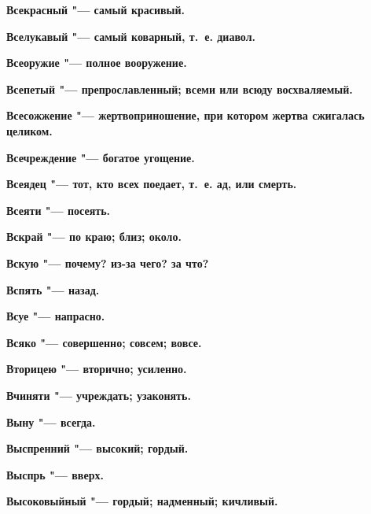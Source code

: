 \begin{multicols}{2}
\bfseries Всекрасный\normalfont{} "--- самый красивый. 




\bfseries Вселукавый\normalfont{} "--- самый коварный, т.~е. диавол. 




\bfseries Всеоружие\normalfont{} "--- полное вооружение. 




\bfseries Всепетый\normalfont{} "--- препрославленный; всеми или всюду восхваляемый. 




\bfseries Всесожжение\normalfont{} "--- жертвоприношение, при котором жертва сжигалась целиком. 




\bfseries Всечреждение\normalfont{} "--- богатое угощение. 




\bfseries Всеядец\normalfont{} "--- тот, кто всех поедает, т.~е. ад, или смерть. 




\bfseries Всеяти\normalfont{} "--- посеять. 




\bfseries Вскрай\normalfont{} "--- по краю; близ; около. 




\bfseries Вскую\normalfont{} "--- почему? из-за чего? за что? 




\bfseries Вспять\normalfont{} "--- назад. 




\bfseries Всуе\normalfont{} "--- напрасно. 




\bfseries Всяко\normalfont{} "--- совершенно; совсем; вовсе. 




\bfseries Вторицею\normalfont{} "--- вторично; усиленно. 




\bfseries Вчиняти\normalfont{} "--- учреждать; узаконять. 




\bfseries Выну\normalfont{} "--- всегда. 




\bfseries Выспренний\normalfont{} "--- высокий; гордый. 




\bfseries Выспрь\normalfont{} "--- вверх. 




\bfseries Высоковыйный\normalfont{} "--- гордый; надменный; кичливый. 





\end{multicols}

